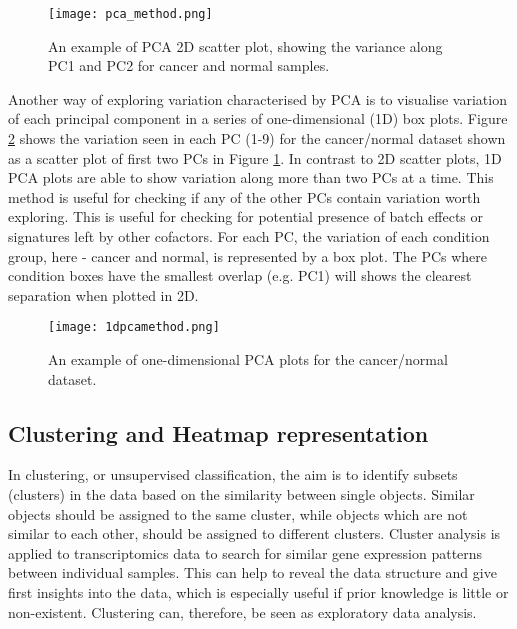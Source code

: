             \begin{figure}[!h]
            \centering
            \texttt{[image: pca\_method.png]}
            \caption{An example of PCA 2D scatter plot, showing the variance along PC1 and PC2 for cancer and normal samples.}
            \label{fig:pcamethod}
            \end{figure}
        
    \newpage
    Another way of exploring variation characterised by PCA is to visualise variation of each principal component in a series of one-dimensional (1D) box plots. Figure \ref{fig:1dpcamethod} shows the variation seen in each PC (1-9) for the cancer/normal dataset shown as a scatter plot of first two PCs in Figure \ref{fig:pcamethod}. 
    In contrast to 2D scatter plots, 1D PCA plots are able to show variation along more than two PCs at a time. This method is useful for checking if any of the other PCs contain variation worth exploring. This is useful for checking for potential presence of batch effects or signatures left by other cofactors. 
    For each PC, the variation of each condition group, here - cancer and normal, is represented by a box plot. The PCs where condition boxes have the smallest overlap (e.g. PC1) will shows the clearest separation when plotted in 2D. \\
       
    
            \begin{figure}[h]
            \centering
            \texttt{[image: 1dpcamethod.png]}
            \caption{An example of one-dimensional PCA plots for the cancer/normal dataset. }
            \label{fig:1dpcamethod}
            \end{figure}
   
  
    \subsection{Clustering and Heatmap representation}
    
    In clustering, or unsupervised classification, the aim is to identify subsets (clusters) in the data based on the similarity between single objects. Similar objects should be assigned to the same cluster, while objects which are not similar to each other, should be assigned to different clusters.
    Cluster analysis is applied to transcriptomics data to search for similar gene expression patterns between individual samples. This can help to reveal the data structure and give first insights into the data, which is especially useful if prior knowledge is little or non-existent. Clustering can, therefore, be seen as exploratory data analysis. 
        
